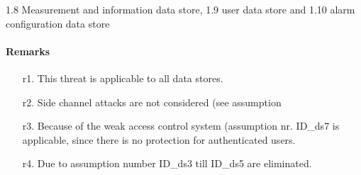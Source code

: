 1.8 Measurement and information data store, 1.9 user data store and 1.10 alarm
configuration data store

\paragraph{Remarks}
	\begin{enumerate}
         \item[r1.] This threat is applicable to all data stores.
         \item[r2.] Side channel attacks are not considered (see assumption
         \item[r3.] Because of the weak access control system (assumption nr.
		 ID\_ds7 is applicable, since there is no protection for authenticated users.
         \item[r4.] Due to assumption number %
		 ID\_ds3 till ID\_ds5 are eliminated.
         \item[] %
    \end{enumerate}
